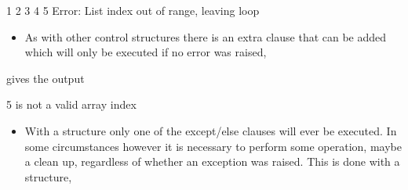 \documentclass[letterpaper,10pt,english,openany]{sphinxmanual}
\begin{document}
\begin{sphinxVerbatim}[commandchars=\\\{\}]
1
2
3
4
5
Error: List index out of range, leaving loop
\end{sphinxVerbatim}
\begin{itemize}
\item {} 
As with other control structures there is an extra  clause
that can be added which will only be executed if no error was raised,

\end{itemize}

\begin{sphinxVerbatim}[commandchars=\\\{\}]
  \PYG{p}{[}\PYG{p}{]}
  
     \PYG{p}{[}\PYG{p}{]}
 
     
\end{sphinxVerbatim}

gives the output

\begin{sphinxVerbatim}[commandchars=\\\{\}]
5 is not a valid array index
\end{sphinxVerbatim}
\begin{itemize}
\item {} 
With a  structure only one of the except/else
clauses will ever be executed. In some circumstances however it is
necessary to perform some operation, maybe a clean up, regardless of
whether an exception was raised. This is done with a
 structure,

\end{itemize}
\end{document}
